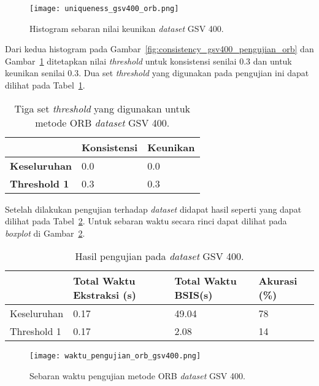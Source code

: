 \begin{figure}[H]
	\centering
	\texttt{[image: uniqueness\_gsv400\_orb.png]}
	\caption{Histogram sebaran nilai keunikan \textit{dataset} GSV 400.}
	\label{fig:uniqueness_gsv400_pengujian_orb}
\end{figure}
Dari kedua histogram pada Gambar~\ref{fig:consistency_gsv400_pengujian_orb} dan Gambar~\ref{fig:uniqueness_gsv400_pengujian_orb} ditetapkan nilai \textit{threshold} untuk konsistensi senilai 0.3 dan untuk keunikan senilai 0.3. Dua set \textit{threshold} yang digunakan pada pengujian ini dapat dilihat pada Tabel~\ref{tab:threshold_gsv400_orb}.
\begin{table}[H]
	\centering
	\begin{tabular}{|l|l|l|}
		\hline
		& \textbf{Konsistensi} & \textbf{Keunikan} \\ \hline
		\textbf{Keseluruhan} & 0.0                  & 0.0               \\ \hline
		\textbf{Threshold 1} & 0.3                  & 0.3               \\ \hline
	\end{tabular}
	\caption{Tiga set \textit{threshold} yang digunakan untuk metode ORB \textit{dataset} GSV 400.}
	\label{tab:threshold_gsv400_orb}
\end{table}
Setelah dilakukan pengujian terhadap \textit{dataset} didapat hasil seperti yang dapat dilihat pada Tabel~\ref{tab:pengujian_orb_gsv400}. Untuk sebaran waktu secara rinci dapat dilihat pada \textit{boxplot} di Gambar~\ref{fig:waktu_pengujian_orb_gsv400}.
\begin{table}[H]
	\centering
	\begin{tabular}{|l|l|l|l|}
		\hline
		& \textbf{Total Waktu Ekstraksi (s)} & \textbf{Total Waktu BSIS(s)} & \textbf{Akurasi (\%)} \\ \hline
		Keseluruhan & 0.17 & 49.04                   & 78                    \\ \hline
		Threshold 1 & 0.17 & 2.08                    & 14                    \\ \hline
	\end{tabular}
	\caption{Hasil pengujian pada \textit{dataset} GSV 400.}
	\label{tab:pengujian_orb_gsv400}
\end{table}
\begin{figure}[H]
	\centering
	\texttt{[image: waktu\_pengujian\_orb\_gsv400.png]}
	\caption{Sebaran waktu pengujian metode ORB \textit{dataset} GSV 400.}
	\label{fig:waktu_pengujian_orb_gsv400}
\end{figure}

